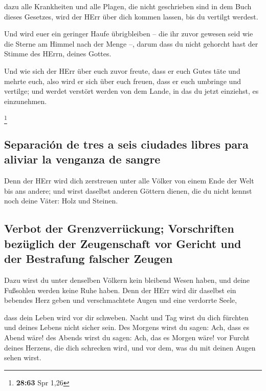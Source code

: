  dazu alle Krankheiten und alle Plagen, die nicht
geschrieben sind in dem Buch dieses Gesetzes, wird der HErr über dich
kommen lassen, bis du vertilgt werdest.

 Und wird euer ein geringer Haufe übrigbleiben -- die ihr
zuvor gewesen seid wie die Sterne am Himmel nach der Menge --, darum
dass du nicht gehorcht hast der Stimme des HErrn, deines Gottes.

 Und wie sich der HErr über euch zuvor freute, dass er
euch Gutes täte und mehrte euch, also wird er sich über euch freuen,
dass er euch umbringe und vertilge; und werdet verstört werden von dem
Lande, in das du jetzt einziehst, es einzunehmen.

\footnote{\textbf{28:63} Spr 1,26}

\hypertarget{separaciuxf3n-de-tres-a-seis-ciudades-libres-para-aliviar-la-venganza-de-sangre}{%
\subsection{Separación de tres a seis ciudades libres para aliviar la
venganza de
sangre}\label{separaciuxf3n-de-tres-a-seis-ciudades-libres-para-aliviar-la-venganza-de-sangre}}

 Denn der HErr wird dich zerstreuen unter alle Völker von
einem Ende der Welt bis ans andere; und wirst daselbst anderen Göttern
dienen, die du nicht kennst noch deine Väter: Holz und Steinen.

\hypertarget{verbot-der-grenzverruxfcckung-vorschriften-bezuxfcglich-der-zeugenschaft-vor-gericht-und-der-bestrafung-falscher-zeugen}{%
\subsection{Verbot der Grenzverrückung; Vorschriften bezüglich der
Zeugenschaft vor Gericht und der Bestrafung falscher
Zeugen}\label{verbot-der-grenzverruxfcckung-vorschriften-bezuxfcglich-der-zeugenschaft-vor-gericht-und-der-bestrafung-falscher-zeugen}}

 Dazu wirst du unter denselben Völkern kein bleibend
Wesen haben, und deine Fußsohlen werden keine Ruhe haben. Denn der HErr
wird dir daselbst ein bebendes Herz geben und verschmachtete Augen und
eine verdorrte Seele,

 dass dein Leben wird vor dir schweben. Nacht und Tag
wirst du dich fürchten und deines Lebens nicht sicher sein.
 Des Morgens wirst du sagen: Ach, dass es Abend wäre! des
Abends wirst du sagen: Ach, das es Morgen wäre! vor Furcht deines
Herzens, die dich schrecken wird, und vor dem, was du mit deinen Augen
sehen wirst.


